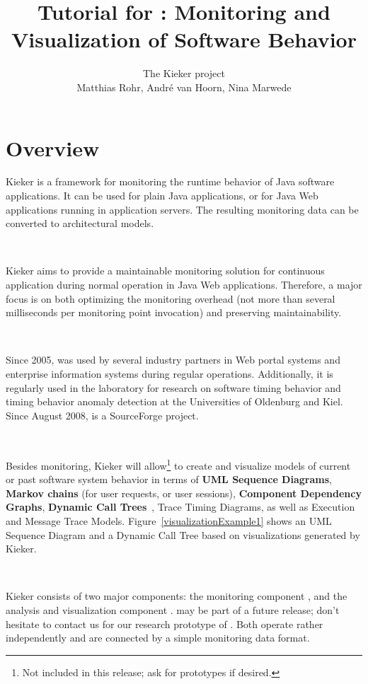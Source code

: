 \documentclass[a4paper,12pt]{scrartcl}
\title{Tutorial for \kieker{}: Monitoring and Visualization of Software Behavior}
\author{The Kieker project \\ Matthias Rohr, Andr\'{e} van Hoorn, Nina Marwede}
\begin{document}
\maketitle
\tableofcontents
\section{Overview}


Kieker is a framework for monitoring the runtime behavior of Java software applications. It can be used for plain Java applications, or for Java Web applications running in application servers. The resulting monitoring data can be converted to architectural models.

\

Kieker aims to provide a maintainable monitoring solution for continuous application during normal operation in Java Web applications. Therefore, a major focus is on both optimizing the monitoring overhead (not more than several milliseconds per monitoring point invocation) and preserving maintainability.

\

Since 2005, \tpmon{} was used by several industry partners in Web portal systems and enterprise information systems during regular operations. Additionally, it is regularly used in the laboratory for research on software timing behavior and timing behavior anomaly detection at the Universities of Oldenburg and Kiel. Since August 2008, \tpmon{} is a SourceForge project.

\

Besides monitoring, Kieker will allow\footnote{Not included in this release; ask for prototypes if desired.} to create and visualize models of current or past software system behavior in terms of \textbf{UML Sequence Diagrams}, \textbf{Markov chains} (for user requests, or user sessions), \textbf{Component Dependency Graphs}, \textbf{Dynamic Call Trees}~\citep{AmmonsBallLarus97ExploitingHardwarePerformanceCountersWithFlowAndContextSensitiveProfiling}, Trace Timing Diagrams, as well as Execution and Message Trace Models. Figure~\ref{visualizationExample1} shows an UML Sequence Diagram and a Dynamic Call Tree based on visualizations generated by Kieker.

\

Kieker consists of two major components: the monitoring component \textbf{\tpmon{}}, and the analysis and visualization component \textbf{\tpan{}}. \tpan{} may be part of a future release; don't hesitate to contact us for our research prototype of \tpan{}. Both operate rather independently and are connected by a simple monitoring data format. %
\end{document}
